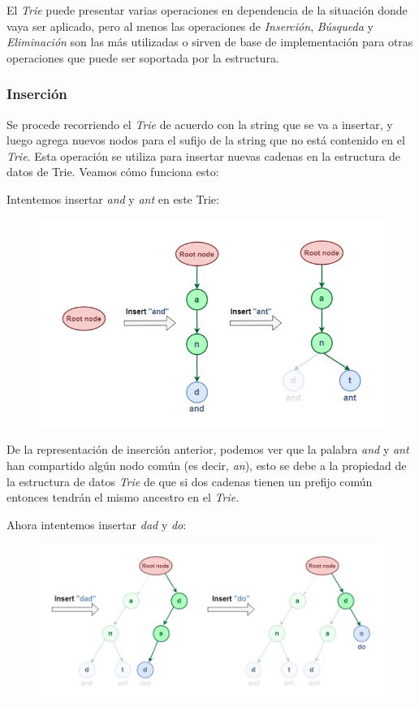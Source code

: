 El \emph{Trie} puede presentar varias operaciones en dependencia de la situación donde vaya ser aplicado, pero al menos las operaciones de \emph{Inserción}, \emph{Búsqueda} y \emph{Eliminación} son las más utilizadas o sirven de base de implementación para otras operaciones que puede ser soportada por la estructura. 

\subsubsection{Inserción}

Se procede recorriendo el \emph{Trie} de acuerdo con la string que se va a insertar, y luego agrega nuevos nodos para el sufijo de la string que no está contenido en el \emph{Trie}. Esta operación se utiliza para insertar nuevas cadenas en la estructura de datos de Trie. Veamos cómo funciona esto:

Intentemos insertar \emph{and} y \emph{ant} en este Trie:  

\begin{figure}[h!]
	\centering
	\includegraphics[width=0.7\linewidth]{img/trie_insert}
	\label{fig:trieinsert}
\end{figure}

De la representación de inserción anterior, podemos ver que la palabra \emph{and} y \emph{ant} han compartido algún nodo común (es decir, \emph{an}), esto se debe a la propiedad de la estructura de datos \emph{Trie} de que si dos cadenas tienen un prefijo común entonces tendrán el mismo ancestro en el \emph{Trie}.

Ahora intentemos insertar \emph{dad} y \emph{do}:

\begin{figure}[h!]
	\centering
	\includegraphics[width=0.7\linewidth]{img/trie_insert_a}
	\label{fig:trieinserta}
\end{figure}

